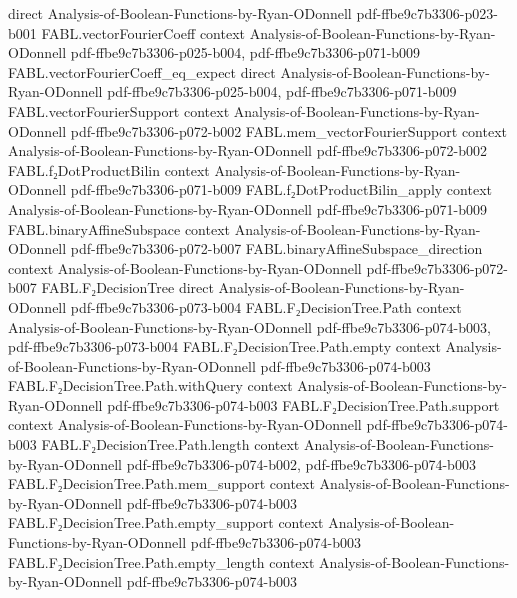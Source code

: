 \begin{theorem}
  {direct}
  {Analysis-of-Boolean-Functions-by-Ryan-ODonnell}
  {pdf-ffbe9c7b3306-p023-b001}
\proofstep
  {FABL.vectorFourierCoeff}
  {context}
  {Analysis-of-Boolean-Functions-by-Ryan-ODonnell}
  {pdf-ffbe9c7b3306-p025-b004,
    pdf-ffbe9c7b3306-p071-b009}
\proofstep
  {FABL.vectorFourierCoeff_eq_expect}
  {direct}
  {Analysis-of-Boolean-Functions-by-Ryan-ODonnell}
  {pdf-ffbe9c7b3306-p025-b004,
    pdf-ffbe9c7b3306-p071-b009}
\proofstep
  {FABL.vectorFourierSupport}
  {context}
  {Analysis-of-Boolean-Functions-by-Ryan-ODonnell}
  {pdf-ffbe9c7b3306-p072-b002}
\proofstep
  {FABL.mem_vectorFourierSupport}
  {context}
  {Analysis-of-Boolean-Functions-by-Ryan-ODonnell}
  {pdf-ffbe9c7b3306-p072-b002}
\proofstep
  {FABL.f₂DotProductBilin}
  {context}
  {Analysis-of-Boolean-Functions-by-Ryan-ODonnell}
  {pdf-ffbe9c7b3306-p071-b009}
\proofstep
  {FABL.f₂DotProductBilin_apply}
  {context}
  {Analysis-of-Boolean-Functions-by-Ryan-ODonnell}
  {pdf-ffbe9c7b3306-p071-b009}
\proofstep
  {FABL.binaryAffineSubspace}
  {context}
  {Analysis-of-Boolean-Functions-by-Ryan-ODonnell}
  {pdf-ffbe9c7b3306-p072-b007}
\proofstep
  {FABL.binaryAffineSubspace_direction}
  {context}
  {Analysis-of-Boolean-Functions-by-Ryan-ODonnell}
  {pdf-ffbe9c7b3306-p072-b007}
\proofstep
  {FABL.F₂DecisionTree}
  {direct}
  {Analysis-of-Boolean-Functions-by-Ryan-ODonnell}
  {pdf-ffbe9c7b3306-p073-b004}
\proofstep
  {FABL.F₂DecisionTree.Path}
  {context}
  {Analysis-of-Boolean-Functions-by-Ryan-ODonnell}
  {pdf-ffbe9c7b3306-p074-b003,
    pdf-ffbe9c7b3306-p073-b004}
\proofstep
  {FABL.F₂DecisionTree.Path.empty}
  {context}
  {Analysis-of-Boolean-Functions-by-Ryan-ODonnell}
  {pdf-ffbe9c7b3306-p074-b003}
\proofstep
  {FABL.F₂DecisionTree.Path.withQuery}
  {context}
  {Analysis-of-Boolean-Functions-by-Ryan-ODonnell}
  {pdf-ffbe9c7b3306-p074-b003}
\proofstep
  {FABL.F₂DecisionTree.Path.support}
  {context}
  {Analysis-of-Boolean-Functions-by-Ryan-ODonnell}
  {pdf-ffbe9c7b3306-p074-b003}
\proofstep
  {FABL.F₂DecisionTree.Path.length}
  {context}
  {Analysis-of-Boolean-Functions-by-Ryan-ODonnell}
  {pdf-ffbe9c7b3306-p074-b002,
    pdf-ffbe9c7b3306-p074-b003}
\proofstep
  {FABL.F₂DecisionTree.Path.mem_support}
  {context}
  {Analysis-of-Boolean-Functions-by-Ryan-ODonnell}
  {pdf-ffbe9c7b3306-p074-b003}
\proofstep
  {FABL.F₂DecisionTree.Path.empty_support}
  {context}
  {Analysis-of-Boolean-Functions-by-Ryan-ODonnell}
  {pdf-ffbe9c7b3306-p074-b003}
\proofstep
  {FABL.F₂DecisionTree.Path.empty_length}
  {context}
  {Analysis-of-Boolean-Functions-by-Ryan-ODonnell}
  {pdf-ffbe9c7b3306-p074-b003}
\proofstep

\end{theorem}
